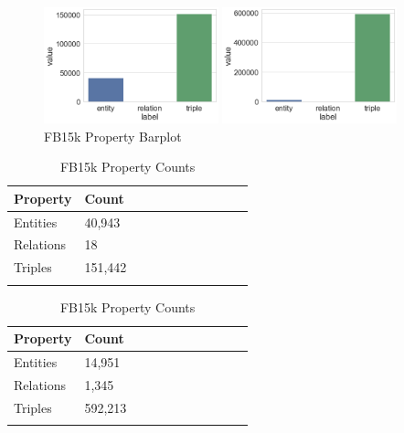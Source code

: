 \bigskip

\begin{figure}[H]
	\parbox{.5\linewidth}{
   		\centering
    		\includegraphics[width=0.45\textwidth]{WN18_Counts}
		\caption{WN18 Property Barplot}
		}
	\hfill
	\parbox{.5\linewidth}{
   		\centering
    		\includegraphics[width=0.45\textwidth]{FB15k_Counts}
		\caption{FB15k Property Barplot}
		}
\end{figure}

\begin{table}[H]
	\parbox{.5\linewidth}{
		\centering
		\begin{tabular}{lllllllllll}
  			\textbf{Property} & \textbf{Count}  \\
  			\hline
  			Entities & 40,943  \\
  			Relations & 18  \\
  			Triples & 151,442 \\
			&
		\end{tabular}
		\caption{WN18 Property Counts}
		}
	\hfill
	\parbox{.5\linewidth}{
		\centering
		\begin{tabular}{lllllllllll}
  			\textbf{Property} & \textbf{Count}  \\
  			\hline
  			Entities & 14,951   \\
  			Relations & 1,345  \\
  			Triples & 592,213  \\
			&
		\end{tabular}
		\caption{FB15k Property Counts}
		}
\end{table}


